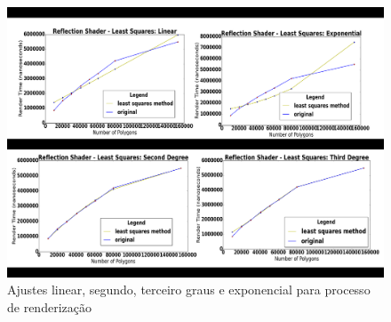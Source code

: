 	\begin{figure}[ht]
	\centering
		\includegraphics[keepaspectratio=true,scale=0.4]{figuras/minquad_render_time.png}
	\caption{Ajustes linear, segundo, terceiro graus e exponencial para processo de renderização}
	\label{linear}
	\end{figure}	
	
